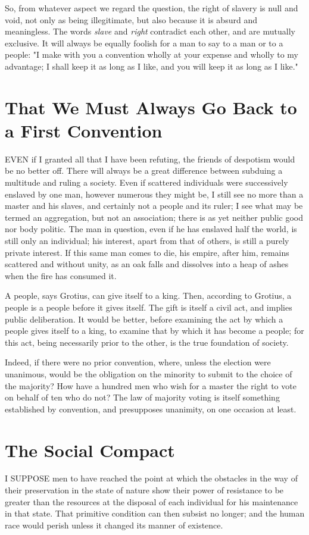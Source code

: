 \documentclass[12pt]{report}
\begin{document}
So, from whatever aspect we regard the question, the right of slavery is null and void, not only as being illegitimate, but also because it is absurd and meaningless. The words \textit{slave} and \textit{right} contradict each other, and are mutually exclusive. It will always be equally foolish for a man to say to a man or to a people: "I make with you a convention wholly at your expense and wholly to my advantage; I shall keep it as long as I like, and you will keep it as long as I like."

\section{That We Must Always Go Back to a First Convention}
EVEN if I granted all that I have been refuting, the friends of despotism would be no better off. There will always be a great difference between subduing a multitude and ruling a society. Even if scattered individuals were successively enslaved by one man, however numerous they might be, I still see no more than a master and his slaves, and certainly not a people and its ruler; I see what may be termed an aggregation, but not an association; there is as yet neither public good nor body politic. The man in question, even if he has enslaved half the world, is still only an individual; his interest, apart from that of others, is still a purely private interest. If this same man comes to die, his empire, after him, remains scattered and without unity, as an oak falls and dissolves into a heap of ashes when the fire has consumed it.

A people, says Grotius, can give itself to a king. Then, according to Grotius, a people is a people before it gives itself. The gift is itself a civil act, and implies public deliberation. It would be better, before examining the act by which a people gives itself to a king, to examine that by which it has become a people; for this act, being necessarily prior to the other, is the true foundation of society.

Indeed, if there were no prior convention, where, unless the election were unanimous, would be the obligation on the minority to submit to the choice of the majority? How have a hundred men who wish for a master the right to vote on behalf of ten who do not? The law of majority voting is itself something established by convention, and presupposes unanimity, on one occasion at least.

\section{The Social Compact}
I SUPPOSE men to have reached the point at which the obstacles in the way of their preservation in the state of nature show their power of resistance to be greater than the resources at the disposal of each individual for his maintenance in that state. That primitive condition can then subsist no longer; and the human race would perish unless it changed its manner of existence.
\end{document}
